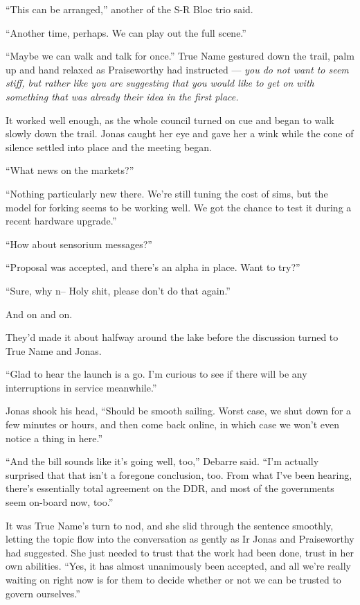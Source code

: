 ``This can be arranged,'' another of the S-R Bloc trio said.

``Another time, perhaps. We can play out the full scene.''

``Maybe we can walk and talk for once.'' True Name gestured down the trail, palm up and hand relaxed as Praiseworthy had instructed — \emph{you do not want to seem stiff, but rather like you are suggesting that you would like to get on with something that was already their idea in the first place.}

It worked well enough, as the whole council turned on cue and began to walk slowly down the trail. Jonas caught her eye and gave her a wink while the cone of silence settled into place and the meeting began.

``What news on the markets?''

``Nothing particularly new there. We're still tuning the cost of sims, but the model for forking seems to be working well. We got the chance to test it during a recent hardware upgrade.''

``How about sensorium messages?''

``Proposal was accepted, and there's an alpha in place. Want to try?''

``Sure, why n-- Holy shit, please don't do that again.''

And on and on.

They'd made it about halfway around the lake before the discussion turned to True Name and Jonas.

``Glad to hear the launch is a go. I'm curious to see if there will be any interruptions in service meanwhile.''

Jonas shook his head, ``Should be smooth sailing. Worst case, we shut down for a few minutes or hours, and then come back online, in which case we won't even notice a thing in here.''

``And the bill sounds like it's going well, too,'' Debarre said. ``I'm actually surprised that that isn't a foregone conclusion, too. From what I've been hearing, there's essentially total agreement on the DDR, and most of the governments seem on-board now, too.''

It was True Name's turn to nod, and she slid through the sentence smoothly, letting the topic flow into the conversation as gently as Ir Jonas and Praiseworthy had suggested. She just needed to trust that the work had been done, trust in her own abilities. ``Yes, it has almost unanimously been accepted, and all we're really waiting on right now is for them to decide whether or not we can be trusted to govern ourselves.''

